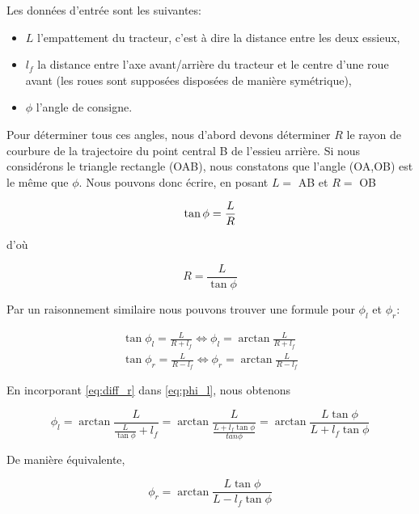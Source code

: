 \documentclass[12pt,a4paper]{report}
\begin{document}
			\para Les données d'entrée sont les suivantes:
			\begin{itemize}
				\item $L$ l'empattement du tracteur, c'est à dire la distance entre les deux essieux,
				\item $l_f$ la distance entre l'axe avant/arrière du tracteur et le centre d'une roue avant (les roues sont supposées disposées de manière symétrique),
				\item $\phi$ l'angle de consigne.
			\end{itemize}
		
			\para Pour déterminer tous ces angles, nous d'abord devons déterminer $R$ le rayon de courbure de la trajectoire du point central B de l'essieu arrière. Si nous considérons le triangle rectangle (OAB), nous constatons que l'angle (OA,OB) est le même que $\phi$. Nous pouvons donc écrire, en posant $L=$ AB et $R=$ OB 
			
			\begin{equation}
			\tan{\phi} = \frac{L}{R} \\
			\end{equation}
			
			d'où
			
			\begin{equation}
			\label{eq:diff_r}
			R = \frac{L}{\tan{\phi}}
			\end{equation}
			
			\para Par un raisonnement similaire nous pouvons trouver une formule pour $\phi_l$ et $\phi_r$:
			
			\begin{gather}
			\label{eq:phi_l}
			\tan{\phi_l} = \frac{L}{R+l_f} \Longleftrightarrow \phi_l = \arctan{\frac{L}{R+l_f}} \\[2ex]
			\tan{\phi_r} = \frac{L}{R-l_f} \Longleftrightarrow \phi_r = \arctan{\frac{L}{R-l_f}}
			\end{gather}
			
			En incorporant \ref{eq:diff_r} dans \ref{eq:phi_l}, nous obtenons
			
			\begin{equation}
			\phi_l = \arctan{\frac{L}{\frac{L}{\tan{\phi}} + l_f}} = \arctan{\frac{L}{\frac{L + l_f\tan{\phi}}{tan{\phi}}}} = \arctan{\frac{L \tan{\phi}}{L+l_f \tan{\phi}}}
			\end{equation}
			
			\para De manière équivalente, 
			
			\begin{equation}
			\phi_r = \arctan{\frac{L\tan{\phi}}{L - l_f \tan{\phi}}}
			\end{equation}
			
\end{document}
